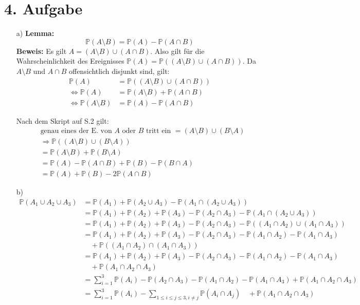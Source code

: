 \documentclass[10pt,a4paper,parskip=half]{scrartcl}
\newcommand{\PP}{\mathbb{P}}
\begin{document}
\section*{4. Aufgabe}
\begin{enumerate}
\item[a)]
	\textbf{Lemma:} 
		$$\PP(A \setminus B) = \PP(A) - \PP(A \cap B)$$
		\textbf{Beweis:} Es gilt $A = (A \setminus B) \cup (A \cap B)$. Also gilt für die Wahrscheinlichkeit des Ereignisses $\PP(A) = \PP((A\setminus B) \cup (A \cap B))$.
		Da $A \setminus B$ und $A \cap B$ offensichtlich disjunkt sind, gilt:
		\begin{align*}
			\PP(A) &=  \PP((A\setminus B) \cup (A \cap B)) \\
			\Leftrightarrow \PP(A) &= \PP(A \setminus B) + \PP(A \cap B) \\
			\Leftrightarrow \PP(A \setminus B) &= \PP(A) - \PP(A \cap B)
		\end{align*}
		
	Nach dem Skript auf S.2 gilt:
	\begin{align*}
		&\text{genau eines der E. von $A$ oder $B$ tritt ein } = ( A \setminus B) \cup (B \setminus A) \\
		&\Rightarrow \PP(( A \setminus B) \cup (B \setminus A)) \\
		&=\PP(A\setminus B) + \PP(B \setminus A) \\
		&= \PP(A) - \PP(A \cap B) + \PP(B) - \PP(B \cap A) \\
		&= \PP(A) + \PP(B) - 2\PP( A \cap B)
	\end{align*}
\item[b)]
\begin{align*}
	\PP(A_1 \cup A_2 \cup A_3) &= \PP(A_1) + \PP(A_2 \cup A_3) - \PP(A_1 \cap (A_2 \cup A_3)) \\
	&=\PP(A_1) + \PP(A_2) + \PP(A_3) - \PP(A_2 \cap A_3) - \PP(A_1 \cap (A_2 \cup A_3)) \\
	&=\PP(A_1) + \PP(A_2) + \PP(A_3) - \PP(A_2 \cap A_3) - \PP((A_1 \cap A_2) \cup (A_1 \cap A_3)) \\	
	&=\PP(A_1) + \PP(A_2) + \PP(A_3) - \PP(A_2 \cap A_3) - \PP(A_1 \cap A_2) - \PP(A_1 \cap A_3) \\
	&\quad + \PP((A_1 \cap A_2) \cap (A_1 \cap A_3))  \\
	&=\PP(A_1) + \PP(A_2) + \PP(A_3) - \PP(A_2 \cap A_3) - \PP(A_1 \cap A_2) - \PP(A_1 \cap A_3) \\
	&\quad + \PP(A_1 \cap A_2 \cap  A_3)  \\ 	
	&= \sum^3_{i = 1} \PP(A_i)  - \PP(A_2 \cap A_3) - \PP(A_1 \cap A_2) - \PP(A_1 \cap A_3) + \PP(A_1 \cap A_2 \cap  A_3) \\
	&= \sum^3_{i = 1} \PP(A_i)  - \sum_{1 \le i \le j \le 3, i \neq j} \PP(A_i \cap A_j) \quad+ \PP(A_1 \cap A_2 \cap  A_3)
\end{align*}	
\end{enumerate}
\end{document}
